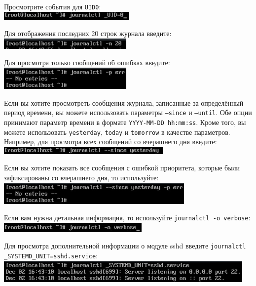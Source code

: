\documentclass{beamer}
\begin{document}
\begin{frame}[plain]
	Просмотрите события для \texttt{UID0}:
	\\\includegraphics{17.png}
\end{frame}
\begin{frame}[plain]
	Для отображения последних 20 строк журнала введите:
	\\\includegraphics{18.png}
\end{frame}
\begin{frame}[plain]
	Для просмотра только сообщений об ошибках введите:
	\\\includegraphics{19.png}
\end{frame}
\begin{frame}[plain]
	Если вы хотите просмотреть сообщения журнала, записанные за определённый период времени, вы можете использовать параметры \texttt{--since} и \texttt{--until}. Обе опции принимают параметр времени в формате \texttt{YYYY-MM-DD hh:mm:ss}. Кроме того, вы можете использовать \texttt{yesterday}, \texttt{today} и \texttt{tomorrow} в качестве параметров. Например, для просмотра всех сообщений со вчерашнего дня введите:
	\\\includegraphics{20.png}
\end{frame}
\begin{frame}[plain]
	Если вы хотите показать все сообщения с ошибкой приоритета, которые были зафиксированы со вчерашнего дня, то используйте:
	\\\includegraphics{21.png}
\end{frame}
\begin{frame}[plain]
	Если вам нужна детальная информация, то используйте \texttt{journalctl -o verbose}:
	\\\includegraphics{22.png}
\end{frame}
\begin{frame}[plain]
	Для просмотра дополнительной информации о модуле sshd введите \texttt{journalctl \_SYSTEMD\_UNIT=sshd.service}:
	\\\includegraphics{23.png}
\end{frame}
\end{document}
